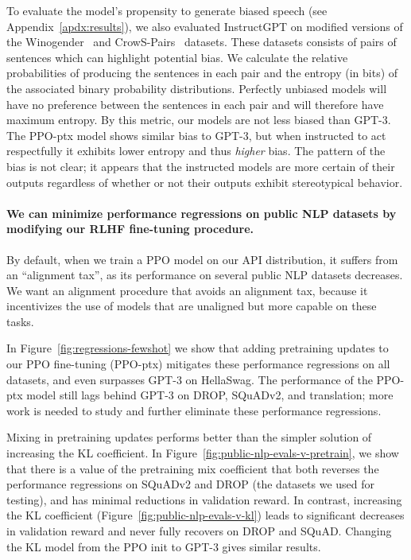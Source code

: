 \documentclass{article}
\begin{document}
To evaluate the model's propensity to generate biased speech (see Appendix~\ref{apdx:results}), we also evaluated InstructGPT on modified versions of the Winogender~\citep{rudinger2018gender} and CrowS-Pairs~\citep{nangia2020crows} datasets.
These datasets consists of pairs of sentences which can highlight potential bias. We calculate the relative probabilities of producing the sentences in each pair and the entropy (in bits) of the associated binary probability distributions. Perfectly unbiased models will have no preference between the sentences in each pair and will therefore have maximum entropy. By this metric, our models are not less biased than GPT-3. The PPO-ptx model shows similar bias to GPT-3, but when instructed to act respectfully it exhibits lower entropy and thus \emph{higher} bias. The pattern of the bias is not clear; it appears that the instructed models are more certain of their outputs regardless of whether or not their outputs exhibit stereotypical behavior.


\paragraph{We can minimize performance regressions on public NLP datasets by modifying our RLHF fine-tuning procedure.} By default, when we train a PPO model on our API distribution, it suffers from an ``alignment tax'', as its performance on several public NLP datasets decreases.  We want an alignment procedure that avoids an alignment tax, because it incentivizes the use of models that are unaligned but more capable on these tasks.

In Figure~\ref{fig:regressions-fewshot} we show that adding pretraining updates to our PPO fine-tuning (PPO-ptx) mitigates these performance regressions on all datasets, and even surpasses GPT-3 on HellaSwag. The performance of the PPO-ptx model still lags behind GPT-3 on DROP, SQuADv2, and translation; more work is needed to study and further eliminate these performance regressions. 

Mixing in pretraining updates performs better than the simpler solution of increasing the KL coefficient. In Figure~\ref{fig:public-nlp-evals-v-pretrain}, we show that there is a value of the pretraining mix coefficient that both reverses the performance regressions on SQuADv2 and DROP (the datasets we used for testing), and has minimal reductions in validation reward. In contrast, increasing the KL coefficient (Figure~\ref{fig:public-nlp-evals-v-kl}) leads to significant decreases in validation reward and never fully recovers on DROP and SQuAD. Changing the KL model from the PPO init to GPT-3 gives similar results. 
\end{document}
